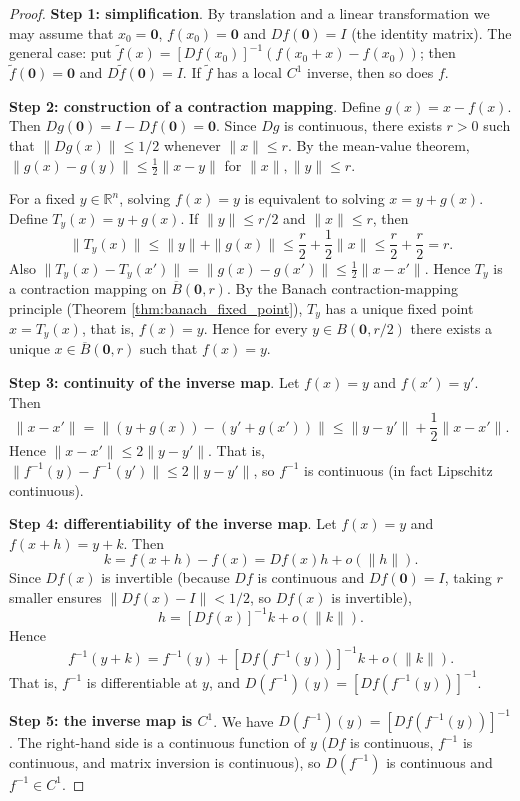\begin{proof}
\textbf{Step 1: simplification}. By translation and a linear transformation we may assume that $x_0 = \mathbf{0}$, $f(x_0) = \mathbf{0}$ and $Df(\mathbf{0}) = I$ (the identity matrix). The general case: put $\tilde{f}(x) = [Df(x_0)]^{-1} (f(x_0 + x) - f(x_0))$; then $\tilde{f}(\mathbf{0}) = \mathbf{0}$ and $D\tilde{f}(\mathbf{0}) = I$. If $\tilde{f}$ has a local $C^1$ inverse, then so does $f$.

\textbf{Step 2: construction of a contraction mapping}. Define $g(x) = x - f(x)$. Then $Dg(\mathbf{0}) = I - Df(\mathbf{0}) = \mathbf{0}$. Since $Dg$ is continuous, there exists $r > 0$ such that $\|Dg(x)\| \le 1/2$ whenever $\|x\| \le r$. By the mean-value theorem, $\|g(x) - g(y)\| \le \frac{1}{2} \|x - y\|$ for $\|x\|, \|y\| \le r$.

For a fixed $y \in \mathbb{R}^n$, solving $f(x) = y$ is equivalent to solving $x = y + g(x)$. Define $T_y(x) = y + g(x)$. If $\|y\| \le r/2$ and $\|x\| \le r$, then
\[
\|T_y(x)\| \le \|y\| + \|g(x)\| \le \frac{r}{2} + \frac{1}{2} \|x\| \le \frac{r}{2} + \frac{r}{2} = r.
\]
Also $\|T_y(x) - T_y(x')\| = \|g(x) - g(x')\| \le \frac{1}{2} \|x - x'\|$. Hence $T_y$ is a contraction mapping on $\overline{B}(\mathbf{0}, r)$. By the Banach contraction-mapping principle (Theorem \ref{thm:banach_fixed_point}), $T_y$ has a unique fixed point $x = T_y(x)$, that is, $f(x) = y$. Hence for every $y \in B(\mathbf{0}, r/2)$ there exists a unique $x \in \overline{B}(\mathbf{0}, r)$ such that $f(x) = y$.

\textbf{Step 3: continuity of the inverse map}. Let $f(x) = y$ and $f(x') = y'$. Then
\[
\|x - x'\| = \|(y + g(x)) - (y' + g(x'))\| \le \|y - y'\| + \frac{1}{2} \|x - x'\|.
\]
Hence $\|x - x'\| \le 2 \|y - y'\|$. That is, $\|f^{-1}(y) - f^{-1}(y')\| \le 2 \|y - y'\|$, so $f^{-1}$ is continuous (in fact Lipschitz continuous).

\textbf{Step 4: differentiability of the inverse map}. Let $f(x) = y$ and $f(x + h) = y + k$. Then
\[
k = f(x + h) - f(x) = Df(x) h + o(\|h\|).
\]
Since $Df(x)$ is invertible (because $Df$ is continuous and $Df(\mathbf{0}) = I$, taking $r$ smaller ensures $\|Df(x) - I\| < 1/2$, so $Df(x)$ is invertible),
\[
h = [Df(x)]^{-1} k + o(\|k\|).
\]
Hence
\[
f^{-1}(y + k) = f^{-1}(y) + [Df(f^{-1}(y))]^{-1} k + o(\|k\|).
\]
That is, $f^{-1}$ is differentiable at $y$, and $D(f^{-1})(y) = [Df(f^{-1}(y))]^{-1}$.

\textbf{Step 5: the inverse map is $C^1$}. We have $D(f^{-1})(y) = [Df(f^{-1}(y))]^{-1}$. The right-hand side is a continuous function of $y$ ($Df$ is continuous, $f^{-1}$ is continuous, and matrix inversion is continuous), so $D(f^{-1})$ is continuous and $f^{-1} \in C^1$.
\end{proof}

